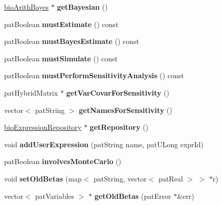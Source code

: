 \begin{DoxyCompactItemize}
\hyperlink{classbio_arith_bayes}{bio\+Arith\+Bayes} $\ast$ {\bfseries get\+Bayesian} ()
\item 
\mbox{\label{classbio_model_a613036c3bd60982639ecbbe01917498b}} 
pat\+Boolean {\bfseries must\+Estimate} () const
\item 
\mbox{\label{classbio_model_a6a6ace580172b16406c446d23ed56b4b}} 
pat\+Boolean {\bfseries must\+Bayes\+Estimate} () const
\item 
\mbox{\label{classbio_model_a3c8b2ec298ccf911828caf23afca26b1}} 
pat\+Boolean {\bfseries must\+Simulate} () const
\item 
\mbox{\label{classbio_model_a7f7db5a3254168ab884ea88aa6756045}} 
pat\+Boolean {\bfseries must\+Perform\+Sensitivity\+Analysis} () const
\item 
\mbox{\label{classbio_model_aa967b85939f2bdf2227385dba1a75dfa}} 
pat\+Hybrid\+Matrix $\ast$ {\bfseries get\+Var\+Covar\+For\+Sensitivity} ()
\item 
\mbox{\label{classbio_model_a0e628d1862dab746c9c8ca5874b40c0d}} 
vector$<$ pat\+String $>$ {\bfseries get\+Names\+For\+Sensitivity} ()
\item 
\mbox{\label{classbio_model_afc8862f382db041c2249b78b06044acb}} 
\hyperlink{classbio_expression_repository}{bio\+Expression\+Repository} $\ast$ {\bfseries get\+Repository} ()
\item 
\mbox{\label{classbio_model_ac1a771443fce3ec6ec914eddf7dd6bae}} 
void {\bfseries add\+User\+Expression} (pat\+String name, pat\+U\+Long expr\+Id)
\item 
\mbox{\label{classbio_model_acc3ffbf13e2316e4ec8fb040194ced5d}} 
pat\+Boolean {\bfseries involves\+Monte\+Carlo} ()
\item 
\mbox{\label{classbio_model_a3d16cf6efdd7f53e2e60ae259e44123a}} 
void {\bfseries set\+Old\+Betas} (map$<$ pat\+String, vector$<$ pat\+Real $>$ $>$ $\ast$r)
\item 
\mbox{\label{classbio_model_aa767ecd42466ed2d6d1f3970c86b1343}} 
vector$<$ pat\+Variables $>$ $\ast$ {\bfseries get\+Old\+Betas} (pat\+Error $\ast$\&err)
\end{DoxyCompactItemize}
